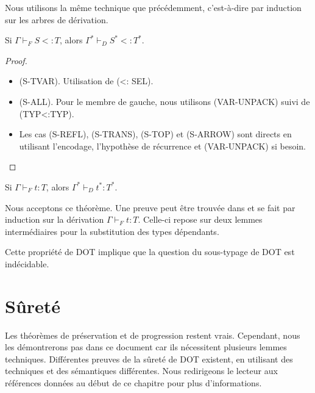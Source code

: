 Nous utilisons la même technique que précédemment, c'est-à-dire par induction
sur les arbres de dérivation.
\begin{theorem}
  Si $\Gamma \vdash_{F} S <: T$, alors $\Gamma^{*} \vdash_{D} S^{*} <: T^{*}$.
\end{theorem}

\begin{proof}
  \begin{itemize}
  \item (S-TVAR). Utilisation de (<: SEL).
  \item (S-ALL). Pour le membre de gauche, nous utilisons (VAR-UNPACK) suivi de
    (TYP<:TYP).
  \item Les cas (S-REFL), (S-TRANS), (S-TOP) et (S-ARROW) sont directs
    en utilisant l'encodage, l'hypothèse de récurrence et (VAR-UNPACK)
    si besoin.
  \end{itemize}
\end{proof}

\begin{theorem}
  Si $\Gamma \vdash_{F} t : T$, alors $\Gamma^{*} \vdash_{D} t^{*} : T^{*}$.
\end{theorem}

Nous acceptons ce théorème. Une preuve peut être trouvée dans
\cite{WF-DOT-2016} et se fait par induction sur la dérivation $\Gamma \vdash_{F}
t : T$. Celle-ci repose sur deux lemmes intermédiaires pour la
substitution des types dépendants.

Cette propriété de DOT implique que la question du sous-typage de DOT est
indécidable.


\section{Sûreté}

Les théorèmes de préservation et de progression
restent vrais. Cependant, nous les démontrerons pas dans ce document car ils
nécessitent plusieurs lemmes techniques. Différentes preuves de la sûreté de DOT
existent, en utilisant des techniques et des sémantiques différentes. Nous
redirigeons le lecteur aux références données au début de ce chapitre pour plus d'informations.